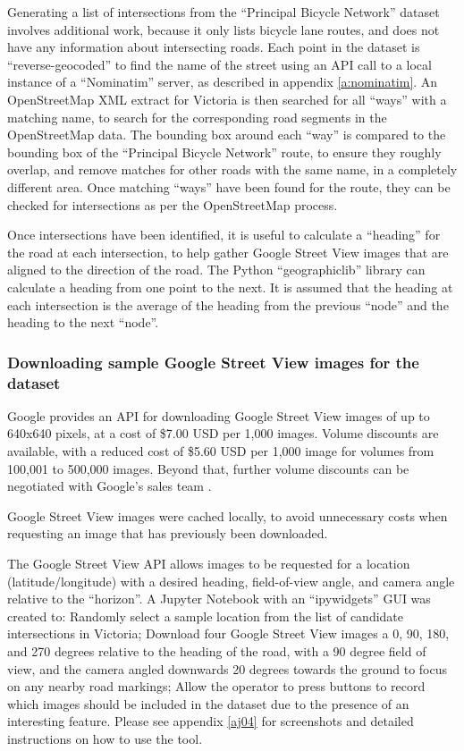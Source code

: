 \documentclass[11pt,twoside]{report}
\begin{document}
Generating a list of intersections from the ``Principal Bicycle Network'' dataset involves additional work, because it only lists bicycle lane routes, and does not have any information about intersecting roads.  Each point in the dataset is ``reverse-geocoded'' to find the name of the street using an API call to a local instance of a ``Nominatim'' server, as described in appendix \ref{a:nominatim}.  An OpenStreetMap XML extract for Victoria is then searched for all ``ways'' with a matching name, to search for the corresponding road segments in the OpenStreetMap data.  The bounding box around each ``way'' is compared to the bounding box of the ``Principal Bicycle Network'' route, to ensure they roughly overlap, and remove matches for other roads with the same name, in a completely different area.  Once matching ``ways'' have been found for the route, they can be checked for intersections as per the OpenStreetMap process.

Once intersections have been identified, it is useful to calculate a ``heading'' for the road at each intersection, to help gather Google Street View images that are aligned to the direction of the road.  The Python ``geographiclib'' library can calculate a heading from one point to the next.  It is assumed that the heading at each intersection is the average of the heading from the previous ``node'' and the heading to the next ``node''.


\subsubsection{Downloading sample Google Street View images for the dataset}
\label{s:sample}

Google provides an API for downloading Google Street View images of up to 640x640 pixels, at a cost of \$7.00 USD per 1,000 images.  Volume discounts are available, with a reduced cost of \$5.60 USD per 1,000 image for volumes from 100,001 to 500,000 images.  Beyond that, further volume discounts can be negotiated with Google's sales team \cite{gsv_billing}.

Google Street View images were cached locally, to avoid unnecessary costs when requesting an image that has previously been downloaded.

The Google Street View API allows images to be requested for a location (latitude/longitude) with a desired heading, field-of-view angle, and camera angle relative to the ``horizon''.  A Jupyter Notebook with an ``ipywidgets'' GUI was created to:  Randomly select a sample location from the list of candidate intersections in Victoria; Download four Google Street View images a 0, 90, 180, and 270 degrees relative to the heading of the road, with a 90 degree field of view, and the camera angled downwards 20 degrees towards the ground to focus on any nearby road markings;  Allow the operator to press buttons to record which images should be included in the dataset due to the presence of an interesting feature.  Please see appendix \ref{aj04} for screenshots and detailed instructions on how to use the tool.
\end{document}
